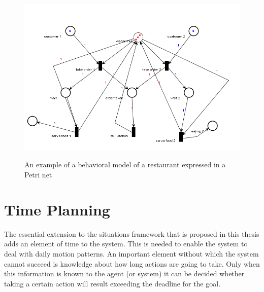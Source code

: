 \documentclass[11pt, a4paper]{book}
\begin{document}
\begin{figure}
\begin{center}
\includegraphics[width=450pt]{restaurant.png}
\label{restaurantnet}
\end{center}
\caption{An example of a behavioral model of a restaurant expressed in a Petri net}

\end{figure}

\section{Time Planning}
The essential extension to the situations framework that is proposed in this thesis adds an element of time to the system. This is needed to enable the system to deal with daily motion patterns. An important element without which the system cannot succeed is knowledge about how long actions are going to take. Only when this information is known to the agent (or system) it can be decided whether taking a certain action will result exceeding the deadline for the goal.
\end{document}
